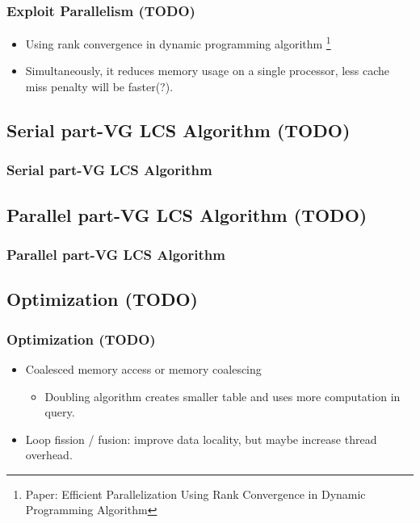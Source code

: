 \begin{frame}
	\frametitle{Exploit Parallelism (TODO)}
	\begin{itemize}
		\setlength\itemsep{1em}
		\item Using rank convergence in dynamic programming algorithm
			\footnote{Paper: Efficient Parallelization Using Rank Convergence in 
				Dynamic Programming Algorithm}
		\item Simultaneously, it reduces memory usage on a single processor,
			less cache miss penalty will be faster(?).
	\end{itemize}
\end{frame}

\subsection{Serial part-VG LCS Algorithm (TODO)}
\begin{frame}
	\frametitle{Serial part-VG LCS Algorithm}
\end{frame}

\subsection{Parallel part-VG LCS Algorithm (TODO)}
\begin{frame}
	\frametitle{Parallel part-VG LCS Algorithm}
\end{frame}

\subsection{Optimization (TODO)}
\begin{frame}
	\frametitle{Optimization (TODO)}
	\begin{itemize}
		\setlength\itemsep{1em}
		\item Coalesced memory access or memory coalescing
			\begin{itemize}
				\item Doubling algorithm creates smaller table
					and uses more computation in query.
			\end{itemize}
		\item Loop fission / fusion: improve data locality, 
			but maybe increase thread overhead.
	\end{itemize}
\end{frame}